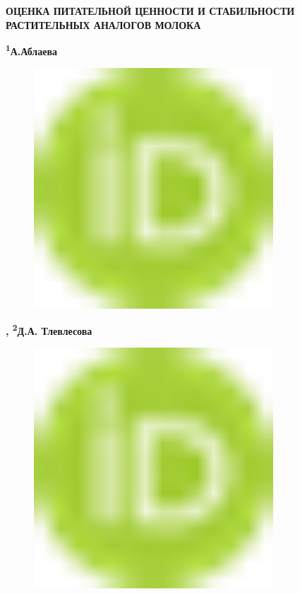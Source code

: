 
{\bfseries ОЦЕНКА ПИТАТЕЛЬНОЙ ЦЕННОСТИ И СТАБИЛЬНОСТИ РАСТИТЕЛЬНЫХ АНАЛОГОВ
МОЛОКА}

{\bfseries \textsuperscript{1}А.Аблаева}
\begin{figure}[H]
	\centering
	\includegraphics[width=0.8\textwidth]{media/pish/image10}
	\caption*{}
\end{figure}
{\bfseries \textsuperscript{\envelope },
\textsuperscript{2}Д.А.
Тлевлесова}
\begin{figure}[H]
	\centering
	\includegraphics[width=0.8\textwidth]{media/pish/image10}
	\caption*{}
\end{figure}
